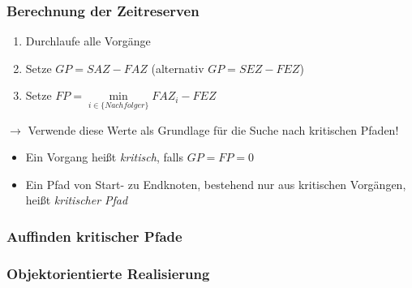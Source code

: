 \documentclass[ngerman, t]{beamer}
\begin{document}
\begin{frame}
  \frametitle{Berechnung der Zeitreserven}
  \begin{enumerate}
    \item Durchlaufe alle Vorg\"ange
    \item Setze $GP=SAZ-FAZ$ (alternativ $GP=SEZ-FEZ$)
    \item Setze $FP=\min\limits_{i \in \{Nachfolger\}} FAZ_i - FEZ$
  \end{enumerate}
  $\rightarrow$ Verwende diese Werte als Grundlage f\"ur die Suche
  nach kritischen Pfaden!
  \begin{itemize}
    \item Ein Vorgang hei{\ss}t \textit{kritisch}, falls $GP=FP=0$
    \item Ein Pfad von Start- zu Endknoten, bestehend nur aus
      kritischen Vorg\"angen, hei{\ss}t \textit{kritischer Pfad}
  \end{itemize}
\end{frame}

\begin{frame}
  \frametitle{Auffinden kritischer Pfade}
  \begin{figure}
    \resizebox{!}{100px}{}
  \end{figure}
\end{frame}

\begin{frame}
  \frametitle{Objektorientierte Realisierung}
  \begin{figure}
    \resizebox{!}{200px}{
      
    }
  \end{figure}
\end{frame}
\end{document}
